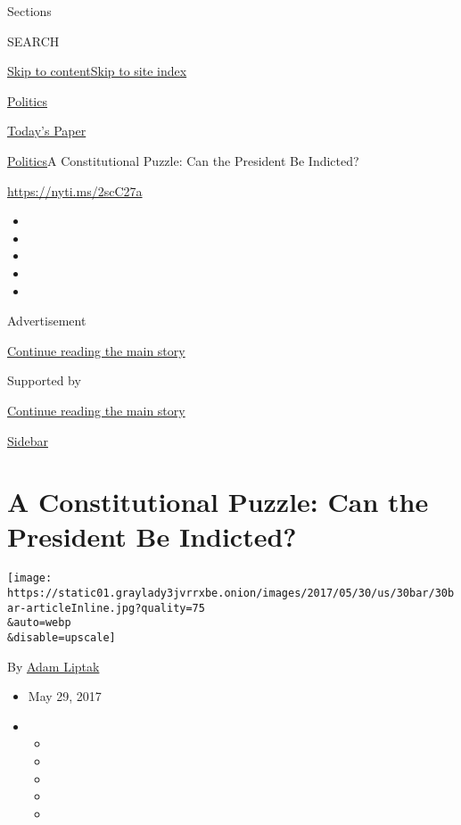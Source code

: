 Sections

SEARCH

\protect\hyperlink{site-content}{Skip to
content}\protect\hyperlink{site-index}{Skip to site index}

\href{https://www.nytimes3xbfgragh.onion/section/politics}{Politics}

\href{https://myaccount.nytimes3xbfgragh.onion/auth/login?response_type=cookie\&client_id=vi}{}

\href{https://www.nytimes3xbfgragh.onion/section/todayspaper}{Today's
Paper}

\href{/section/politics}{Politics}\textbar{}A Constitutional Puzzle: Can
the President Be Indicted?

\url{https://nyti.ms/2scC27a}

\begin{itemize}
\item
\item
\item
\item
\item
\end{itemize}

Advertisement

\protect\hyperlink{after-top}{Continue reading the main story}

Supported by

\protect\hyperlink{after-sponsor}{Continue reading the main story}

\href{/column/sidebar}{Sidebar}

\hypertarget{a-constitutional-puzzle-can-the-president-be-indicted}{%
\section{A Constitutional Puzzle: Can the President Be
Indicted?}\label{a-constitutional-puzzle-can-the-president-be-indicted}}

\texttt{[image: https://static01.graylady3jvrrxbe.onion/images/2017/05/30/us/30bar/30bar-articleInline.jpg?quality=75\\\&auto=webp\\\&disable=upscale]}

By \href{http://www.nytimes3xbfgragh.onion/by/adam-liptak}{Adam Liptak}

\begin{itemize}
\item
  May 29, 2017
\item
  \begin{itemize}
  \item
  \item
  \item
  \item
  \item
  \end{itemize}
\end{itemize}


